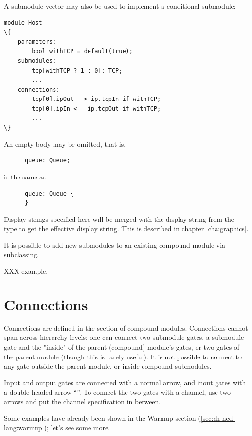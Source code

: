 A submodule vector may also be used to implement a conditional submodule:

\begin{Verbatim}[commandchars=\\\{\}]
module Host
\{
    parameters:
        bool withTCP = default(true);
    submodules:
        tcp[withTCP ? 1 : 0]: TCP;
        ...
    connections:
        tcp[0].ipOut --> ip.tcpIn if withTCP;
        tcp[0].ipIn <-- ip.tcpOut if withTCP;
        ...
\}
\end{Verbatim}

An empty body may be omitted, that is,

\begin{Verbatim}
      queue: Queue;
\end{Verbatim}

is the same as

\begin{Verbatim}
      queue: Queue {
      }
\end{Verbatim}

Display strings specified here will be merged with the display string
from the type to get the effective display string. This is described
in chapter \ref{cha:graphics}.

It is possible to add new submodules to an existing compound module via
subclassing.

XXX example.



\section{Connections}
\label{sec:ch-ned-lang:connections}

Connections are defined in the  section of compound
modules. Connections cannot span across hierarchy levels: one can connect
two submodule gates, a submodule gate and the "inside" of the parent
(compound) module's gates, or two gates of the parent module (though this
is rarely useful). It is not possible to connect to any gate outside the
parent module, or inside compound submodules.

Input and output gates are connected with a normal arrow, and inout gates
with a double-headed arrow ``\ttt{<-{}->}''. To connect the two gates
with a channel, use two arrows and put the channel specification in between.

Some examples have already been shown in the Warmup section
(\ref{sec:ch-ned-lang:warmup}); let's see some more.

